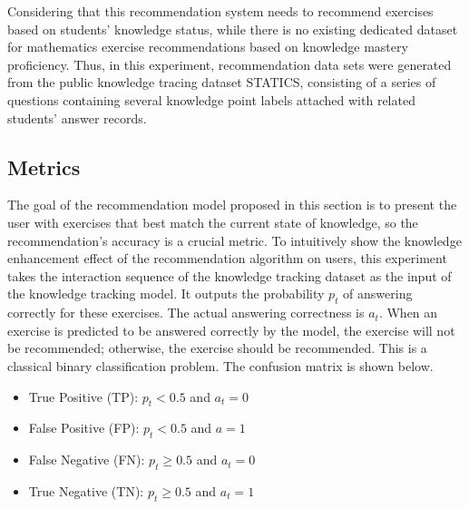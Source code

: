 Considering that this recommendation system needs to recommend exercises based on students' knowledge status, while there is no existing dedicated dataset for mathematics exercise recommendations based on knowledge mastery proficiency. Thus, in this experiment, recommendation data sets were generated from the public knowledge tracing dataset STATICS, consisting of a series of questions containing several knowledge point labels attached with related students' answer records.


\subsection{Metrics}



The goal of the recommendation model proposed in this section is to present the user with exercises that best match the current state of knowledge, so the recommendation's accuracy is a crucial metric. To intuitively show the knowledge enhancement effect of the recommendation algorithm on users, this experiment takes the interaction sequence of the knowledge tracking dataset as the input of the knowledge tracking model. It outputs the probability \(p_{t}\) of answering correctly for these exercises. The actual answering correctness is \(a_t\). When an exercise is predicted to be answered correctly by the model, the exercise will not be recommended; otherwise, the exercise should be recommended. This is a classical binary classification problem. The confusion matrix is shown below.

\begin{itemize}
    \item True Positive (TP): \(p_{t}<0.5\) and \(a_t=0\)
    \item False Positive (FP): \(p_{t} <0.5\) and \(a=1\)
    \item False Negative (FN): \(p_{t}\geq 0.5\) and \(a_t=0\)
    \item True Negative (TN): \(p_{t}\geq 0.5\) and \(a_t=1\)
\end{itemize}

